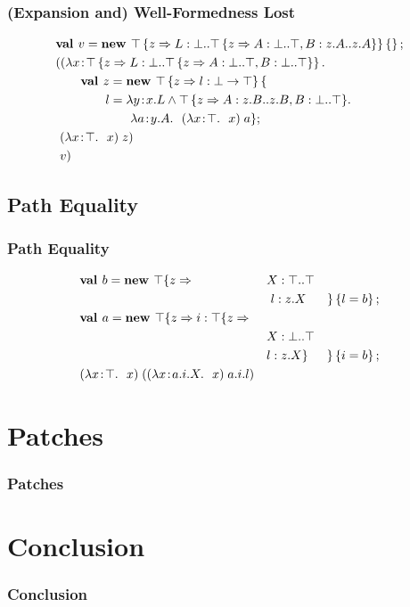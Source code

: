\documentclass{beamer}
\begin{document}
\begin{frame}
\frametitle{(Expansion and) Well-Formedness Lost}
\begin{align*}
&\mlnew v {\Top \refine z {\Ldecl L \Bot {\Top \refine z {\Ldecl A \Bot \Top, \Ldecl B {z.A} {z.A}}}} \ldefs{}}{
\mlapp {\abs x {\Top \refine z {\Ldecl L \Bot {\Top \refine z {\Ldecl A \Bot \Top, \Ldecl B \Bot \Top}}}} {\\&\gap
\mlnew z {\Top \refine z {\ldecl l {\Bot \tfun \Top}}\mlldefs{\\&\gap\gap l = \abs y {x.L \tand {\Top \refine z {\Ldecl A {z.B} {z.B}, \Ldecl B \Bot \Top}}} {\\&\gap\gap\gap\abs a {y.A} {\app {(\abs x \Top x)} a}}}}{
\ \app {(\abs x \Top x)} z
}}}{\ v}}
\end{align*}
\end{frame}

\subsection{Path Equality}
\begin{frame}
\frametitle{Path Equality}
\begin{align*}
&\textbf{val }b = \textbf{new }\top \{z \Rightarrow &&X : \top..\top&\\
&&&\ l : z.X& \}\left\{l = b\right\} ;\;\\&
\textbf{val }a = \textbf{new }\top \{z \Rightarrow i : \top \{z \Rightarrow &&&\\
&&&X : \bot..\top\\
&&&l : z.X \}& \}\left\{i = b\right\} ;\;\\&
(\lambda x\!:\!\top.\ \ x)\;((\lambda x\!:\!a.i.X.\ \ x)\;a.i.l)
\end{align*}
\end{frame}

\section{Patches}

  \begin{frame}
    \frametitle{Patches}
  \end{frame}

\section{Conclusion}

  \begin{frame}
    \frametitle{Conclusion}
  \end{frame}
\end{document}
